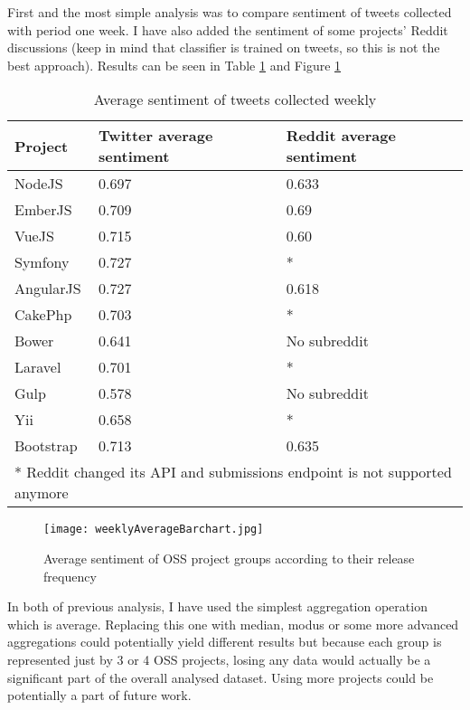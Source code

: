 First and the most simple analysis was to compare sentiment of tweets collected with period one week. I have also added the sentiment of some projects' Reddit discussions (keep in mind that classifier is trained on tweets, so this is not the best approach). Results can be seen in Table \ref{table:weeklyAverageTable} and Figure \ref{fig:weeklyAverageBarchart}

\begin{table}[H]
\centering
\begin{tabular}{ |p{2cm}|p{5.5cm}|p{5.5cm}|}
 \hline
\textbf{Project }& \textbf{Twitter average sentiment} & \textbf{Reddit average sentiment}\\
 \hline
 NodeJS   & 0.697   & 0.633 \\ \hline
 EmberJS   & 0.709   & 0.69\\ \hline
 VueJS   & 0.715   & 0.60\\ \hline 
 Symfony & 0.727   & *\\ \hline   
 AngularJS   & 0.727   & 0.618\\ \hline
 CakePhp & 0.703  & * \\ \hline 
 Bower   & 0.641   & No subreddit\\ \hline 
 Laravel & 0.701   & *\\ \hline
 Gulp & 0.578   & No subreddit\\ \hline
 Yii & 0.658  & * \\ \hline
 Bootstrap & 0.713  & 0.635\\ \hline
 \multicolumn{3}{l}{* Reddit changed its API and submissions endpoint is not supported anymore}
\end{tabular}
\caption{Average sentiment of tweets collected weekly}
\label{table:weeklyAverageTable}
\end{table}


\begin{figure}[H]%
    \centering
	\texttt{[image: weeklyAverageBarchart.jpg]}
    \caption{Average sentiment of OSS project groups according to their release frequency}%
    \label{fig:weeklyAverageBarchart}%
\end{figure}

In both of previous analysis, I have used the simplest aggregation operation which is average. Replacing this one with median, modus or some more advanced aggregations could potentially yield different results but because each group is represented just by 3 or 4 OSS projects, losing any data would actually be a significant part of the overall analysed dataset. Using more projects could be potentially a part of future work.